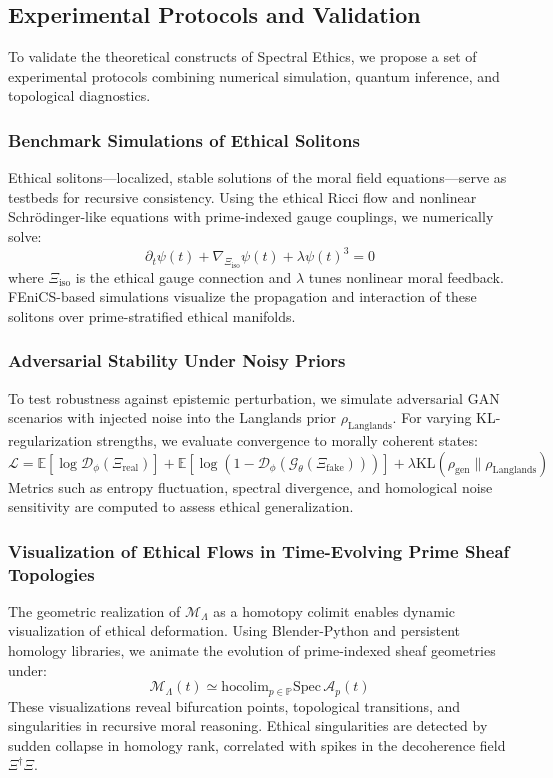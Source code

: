 \documentclass{article}
\theoremstyle{plain}
\theoremstyle{claimstyle}
\begin{document}
\subsection{Experimental Protocols and Validation}

To validate the theoretical constructs of Spectral Ethics, we propose a set of experimental protocols combining numerical simulation, quantum inference, and topological diagnostics.

\subsubsection{Benchmark Simulations of Ethical Solitons}

Ethical solitons—localized, stable solutions of the moral field equations—serve as testbeds for recursive consistency. Using the ethical Ricci flow and nonlinear Schrödinger-like equations with prime-indexed gauge couplings, we numerically solve:
\[
\partial_t \psi(t) + \nabla_{\Xi_{\text{iso}}} \psi(t) + \lambda \psi(t)^3 = 0
\]
where $\Xi_{\text{iso}}$ is the ethical gauge connection and $\lambda$ tunes nonlinear moral feedback. FEniCS-based simulations visualize the propagation and interaction of these solitons over prime-stratified ethical manifolds.

\subsubsection{Adversarial Stability Under Noisy Priors}

To test robustness against epistemic perturbation, we simulate adversarial GAN scenarios with injected noise into the Langlands prior $\rho_{\mathrm{Langlands}}$. For varying KL-regularization strengths, we evaluate convergence to morally coherent states:
\[
\mathcal{L} = \mathbb{E}[\log \mathcal{D}_\phi(\Xi_{\mathrm{real}})] + \mathbb{E}[\log(1 - \mathcal{D}_\phi(\mathcal{G}_\theta(\Xi_{\mathrm{fake}})))] + \lambda \mathrm{KL}(\rho_{\mathrm{gen}} \| \rho_{\mathrm{Langlands}})
\]
Metrics such as entropy fluctuation, spectral divergence, and homological noise sensitivity are computed to assess ethical generalization.

\subsubsection{Visualization of Ethical Flows in Time-Evolving Prime Sheaf Topologies}

The geometric realization of $\mathcal{M}_\Lambda$ as a homotopy colimit enables dynamic visualization of ethical deformation. Using Blender-Python and persistent homology libraries, we animate the evolution of prime-indexed sheaf geometries under:
\[
\mathcal{M}_\Lambda(t) \simeq \mathrm{hocolim}_{p \in \mathbb{P}} \mathrm{Spec}\, \mathcal{A}_p(t)
\]
These visualizations reveal bifurcation points, topological transitions, and singularities in recursive moral reasoning. Ethical singularities are detected by sudden collapse in homology rank, correlated with spikes in the decoherence field $\Xi^\dagger \Xi$.
\end{document}
